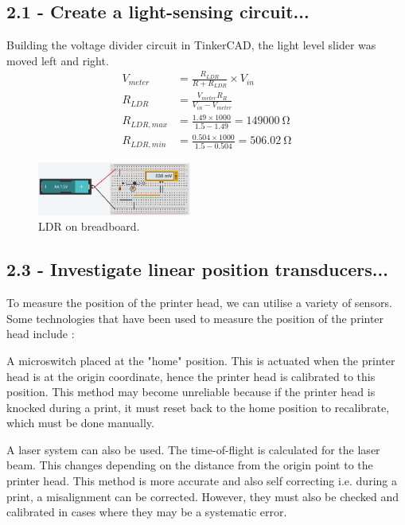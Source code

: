 \documentclass[conference]{IEEEtran}
\begin{document}
\subsection*{2.1 - Create a light-sensing circuit...}
Building the voltage divider circuit in TinkerCAD, the light level slider was moved left and right.
\begin{align}
    V_{meter} &= \frac{R_{LDR}}{R + R_{LDR}} \times V_{in}\\
    R_{LDR} &= \frac{V_{meter}R_{R}}{V_{in} - V_{meter}}\\
    R_{LDR,max} &= \frac{1.49\times 1000}{1.5-1.49} = \SI{149000}{\ohm}\\
    R_{LDR,min} &= \frac{0.504\times 1000}{1.5 - 0.504} = \SI{506.02}{\ohm}
\end{align}
\begin{figure}[htbp]
    \centerline{\includegraphics[width = 0.45\textwidth]{q2-1BreadBoard.png}}
    \caption{LDR on breadboard.}
\end{figure}
\subsection*{2.3 - Investigate linear position transducers...}
To measure the position of the printer head, we can utilise a variety of sensors. Some technologies that have been used to measure the position of the printer head include \cite{b2}:

A microswitch placed at the "home" position. This is actuated when the printer head is at the origin coordinate, hence the printer head is calibrated to this position. This method may become unreliable because if the printer head is knocked during a print, it must reset back to the home position to recalibrate, which must be done manually. 

A laser system can also be used. The time-of-flight is calculated for the laser beam. This changes depending on the distance from the origin point to the printer head. This method is more accurate and also self correcting i.e. during a print, a misalignment can be corrected. However, they must also be checked and calibrated in cases where they may be a systematic error.
\end{document}
